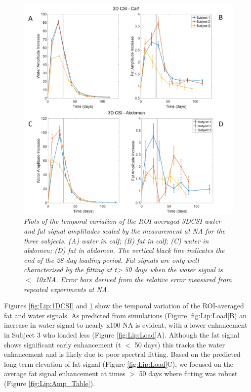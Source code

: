 \documentclass[class=article, crop=false]{standalone}
\begin{document}
\begin{figure}
    \centering
    \includegraphics[width=1\textwidth]{Figures/Lipid/3DCSI_Amplitude.png}
    \caption{\textit{Plots of the temporal variation of the ROI-averaged 3DCSI water and fat signal amplitudes scaled by the measurement at NA for the three subjects. (A) water in calf; (B) fat in calf; (C) water in abdomen; (D) fat in abdomen. The vertical black line indicates the end of the 28-day loading period. Fat signals are only well characterised by the fitting at t> 50 days when the water signal is $<$ 10xNA.  Error bars derived from the relative error measured from repeated experiments at NA.}}
    \label{fig:Lip:3DCSI}
\end{figure}

Figures \ref{fig:Lip:1DCSI} and \ref{fig:Lip:3DCSI} show the temporal variation of the ROI-averaged fat and water signals. As predicted from simulations (Figure \ref{fig:Lip:Load}B) an increase in water signal to nearly x100 NA is evident, with a lower enhancement in Subject 3 who loaded less (Figure \ref{fig:Lip:Load}A). Although the fat signal shows significant early enhancement (t $<$ 50 days) this tracks the water enhancement and is likely due to poor spectral fitting. Based on the predicted long-term elevation of fat signal (Figure \ref{fig:Lip:Load}C), we focused on the average fat signal enhancement at times $>$ 50 days where fitting was robust (Figure \ref{fig:Lip:Amp_Table}). 
\end{document}
